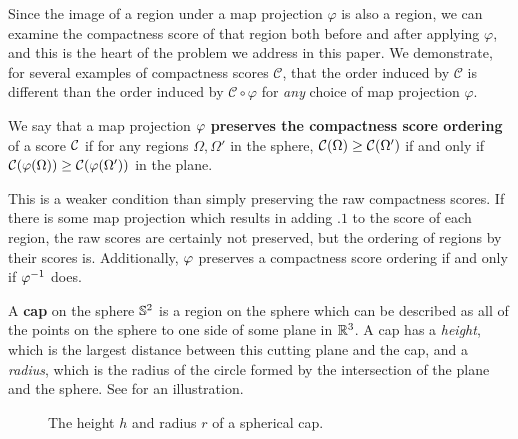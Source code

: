 Since the image of a region under a map projection $\varphi$ is also
a region, we can examine the compactness score of that region both 
before and after applying $\varphi$, and this is the heart of the
problem we address in this paper.  We demonstrate, for several
examples of compactness scores $\mathcal{C}$, that the order
induced by $\mathcal{C}$ is different than the order induced by
$\mathcal{C}\circ\varphi$ for \textit{any} choice of map projection
$\varphi$.

\begin{definition}
  We say that a map projection $\varphi$ \textbf{preserves the  
  compactness score ordering} of a score $\mathcal{C}$ if for any regions 
  $\Omega,\Omega'$ in the sphere, $\mathcal{C}(\Omega)\ge \mathcal{C}(\Omega')$ 
  if and only if $\mathcal{C}(\varphi(\Omega)) \ge \mathcal{C}(\varphi(\Omega'))$ in the plane.
\end{definition}

   This is a weaker condition than simply preserving the raw compactness scores. 
   If there is some map projection which results in adding $.1$ to the score of each region, the raw scores are certainly not preserved, but the ordering of regions by their scores is. Additionally, $\varphi$ preserves a compactness score ordering 
  if and only if $\varphi^{-1}$ does.



\begin{definition}
  A 
  \textbf{cap} on the sphere  $\mathbb{S}^2$ is a region on the sphere
 which can be described as all of the points on the sphere to one side of some plane 
 in $\mathbb{R}^3$.  A cap has a \textit{height}, which is the largest distance between this cutting plane and the cap, and a \textit{radius}, which is the radius of the circle formed by the intersection of the plane and the sphere.  See  for an illustration.
\end{definition}


\begin{figure}[h]
  \centering
  
  \caption{ The height $h$ and radius $r$ of a spherical cap. }
  \label{fig:caphr}
\end{figure}





